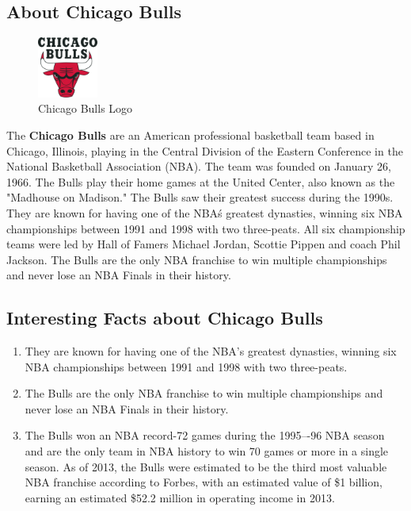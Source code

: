 \documentclass[a4paper]{article}
\begin{document}
\subsection{About Chicago Bulls}
\vspace{1cm}
\begin{figure}[ht]
\begin{center}
\includegraphics[width=2cm,height=2cm]{ChiacgoBullsLogo.png}
\end{center}
\caption{Chicago Bulls Logo}
\label{Img:ChicagoBullsLogo}
\end{figure}
\vspace{1cm}
The \textbf{Chicago Bulls} are an American professional basketball team based in Chicago, Illinois, playing in the Central Division of the Eastern Conference in the National Basketball Association (NBA). The team was founded on January 26, 1966. The Bulls play their home games at the United Center, also known as the "Madhouse on Madison." The Bulls saw their greatest success during the 1990s. They are known for having one of the NBA\'s greatest dynasties, winning six NBA championships between 1991 and 1998 with two three-peats. All six championship teams were led by Hall of Famers Michael Jordan, Scottie Pippen and coach Phil Jackson. The Bulls are the only NBA franchise to win multiple championships and never lose an NBA Finals in their history.
\vspace{1cm}
\subsection{Interesting Facts about Chicago Bulls}
\begin{enumerate}
\item They are known for having one of the NBA's greatest dynasties, winning six NBA championships between 1991 and 1998 with two three-peats.
\item The Bulls are the only NBA franchise to win multiple championships and never lose an NBA Finals in their history.
\item The Bulls won an NBA record-72 games during the 1995–-96 NBA season and are the only team in NBA history to win 70 games or more in a single season.
As of 2013, the Bulls were estimated to be the third most valuable NBA franchise according to Forbes, with an estimated value of \$1 billion, earning an estimated \$52.2 million in operating income in 2013.
\end{enumerate}
\vspace{1cm}
\end{document}
